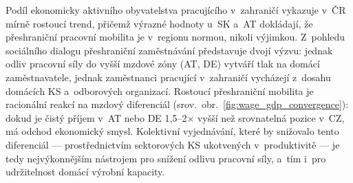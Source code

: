Podíl ekonomicky aktivního obyvatelstva pracujícího v~zahraničí vykazuje v~ČR mírně rostoucí trend, přičemž výrazné hodnoty u~SK a~AT dokládají, že přeshraniční pracovní mobilita je v~regionu normou, nikoli výjimkou.
Z~pohledu sociálního dialogu přeshraniční zaměstnávání představuje dvojí výzvu: jednak odliv pracovní síly do vyšší mzdové zóny (AT, DE) vytváří tlak na domácí zaměstnavatele, jednak zaměstnanci pracující v~zahraničí vycházejí z~dosahu domácích \ac{KS} a~odborových organizací.
Rostoucí přeshraniční mobilita je racionální reakcí na mzdový diferenciál (srov.~obr.~\ref{fig:wage_gdp_convergence}): dokud je čistý příjem v~AT nebo DE 1,5--2× vyšší než srovnatelná pozice v~CZ, má odchod ekonomický smysl.
Kolektivní vyjednávání, které by snižovalo tento diferenciál --- prostřednictvím sektorových \ac{KS} ukotvených v~produktivitě --- je tedy nejvýkonnějším nástrojem pro snížení odlivu pracovní síly, a~tím i~pro udržitelnost domácí výrobní kapacity.


